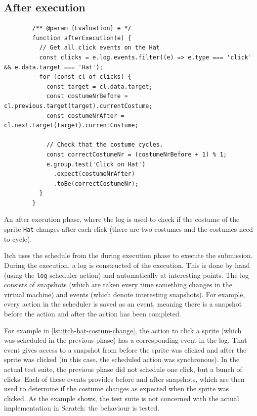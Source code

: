 \documentclass[../main]{subfiles}
\begin{document}
\subsection{After execution}\label{subsec:after-execution}

\begin{listing}
    \begin{verbatim}
        /** @param {Evaluation} e */
        function afterExecution(e) {
          // Get all click events on the Hat
          const clicks = e.log.events.filter((e) => e.type === 'click' && e.data.target === 'Hat');
          for (const cl of clicks) {
            const target = cl.data.target;
            const costumeNrBefore = cl.previous.target(target).currentCostume;
            const costumeNrAfter = cl.next.target(target).currentCostume;

            // Check that the costume cycles.
            const correctCostumeNr = (costumeNrBefore + 1) % 1;
            e.group.test('Click on Hat')
              .expect(costumeNrAfter)
              .toBe(correctCostumeNr);
          }
        }
    \end{verbatim}
    \caption{An after execution phase, where the log is used to check if the costume of the sprite \texttt{Hat} changes after each click (there are two costumes and the costumes need to cycle).}\label{lst:itch-hat-costum-change}
\end{listing}

Itch uses the schedule from the during execution phase to execute the submission.
During the execution, a log is constructed of the execution.
This is done by hand (using the \texttt{log} scheduler action) and automatically at interesting points.
The log consists of snapshots (which are taken every time something changes in the virtual machine) and events (which denote interesting snapshots).
For example, every action in the scheduler is saved as an event, meaning there is a snapshot before the action and after the action has been completed.

For example in \cref{lst:itch-hat-costum-change}, the action to click a sprite (which was scheduled in the previous phase) has a corresponding event in the log.
That event gives access to a snapshot from before the sprite was clicked and after the sprite was clicked (in this case, the scheduled action was synchronous).
In the actual test suite, the previous phase did not schedule one click, but a bunch of clicks.
Each of these events provides before and after snapshots, which are then used to determine if the costume changes as expected when the sprite was clicked.
As the example shows, the test suite is not concerned with the actual implementation in Scratch: the behaviour is tested.
\end{document}
